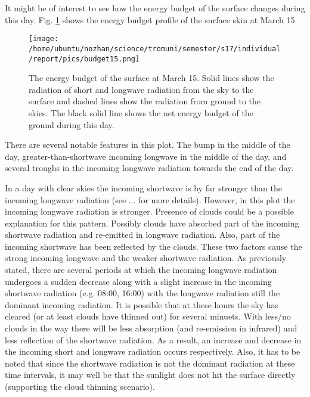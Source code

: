 \documentclass[a4paper,12pt]{article}
\numberwithin{equation}{section} %
\begin{document}
It might be of interest to see how the energy budget of the surface changes during this day. Fig. \ref{budget15} shows the energy budget profile of the surface skin at March 15.

\vspace{0.35cm}

\begin{figure}[bhp]
\texttt{[image: /home/ubuntu/nozhan/science/tromuni/semester/s17/individual/report/pics/budget15.png]}
\caption{The energy budget of the surface at March 15. Solid lines show the radiation of short and longwave radiation from the sky to the surface and dashed lines show the radiation from ground to the skies. The black solid line shows the net energy budget of the ground during this day.}
\label{budget15}
\end{figure}

\vspace{1cm}

There are several notable features in this plot. The bump in the middle of the day, greater-than-shortwave incoming longwave in the middle of the day, and several troughs in the incoming longwave radiation towards the end of the day.

In a day with clear skies the incoming shortwave is by far stronger than the incoming longwave radiation (see ... for more details). However, in this plot the incoming longwave radiation is stronger. Presence of clouds could be a possible explanation for this pattern. Possibly clouds have absorbed part of the incoming shortwave radiation and re-emitted in longwave radiation. Also, part of the incoming shortwave has been reflected by the clouds. These two factors cause the strong incoming longwave and the weaker shortwave radiation. As previously stated, there are several periods at which the incoming longwave radiation undergoes a sudden decrease along with a slight increase in the incoming shortwave radiation (e.g. 08:00, 16:00) with the longwave radiation still the dominant incoming radiation. It is possible that at these hours the sky has cleared (or at least clouds have thinned out) for several minuets. With less/no clouds in the way there will be less absorption (and re-emission in infrared) and less reflection of the shortwave radiation. As a result, an increase and decrease in the incoming short and longwave radiation occurs respectively. Also, it has to be noted that since the shortwave radiation is not the dominant radiation at these time intervals, it may well be that the sunlight does not hit the surface directly (supporting the cloud thinning scenario).
\end{document}
